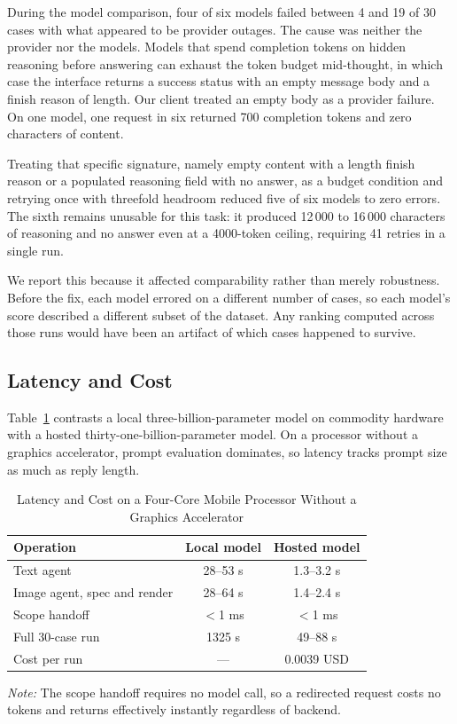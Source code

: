 \documentclass[9pt,twocolumn]{extarticle}
\newcommand{\tabref}[1]{Table~\ref{#1}}
\newcommand{\tabnote}[1]{\par\vspace{2pt}\footnotesize\textit{Note:} #1}
\begin{document}
During the model comparison, four of six models failed between 4 and 19 of 30
cases with what appeared to be provider outages. The cause was neither the
provider nor the models. Models that spend completion tokens on hidden
reasoning before answering can exhaust the token budget mid-thought, in which
case the interface returns a success status with an empty message body and a
finish reason of length. Our client treated an empty body as a provider
failure. On one model, one request in six returned 700 completion tokens and
zero characters of content.

Treating that specific signature, namely empty content with a length finish
reason or a populated reasoning field with no answer, as a budget condition and
retrying once with threefold headroom reduced five of six models to zero
errors. The sixth remains unusable for this task: it produced 12\,000 to
16\,000 characters of reasoning and no answer even at a 4000-token ceiling,
requiring 41 retries in a single run.

We report this because it affected comparability rather than merely robustness.
Before the fix, each model errored on a different number of cases, so each
model's score described a different subset of the dataset. Any ranking computed
across those runs would have been an artifact of which cases happened to
survive.

\subsection{Latency and Cost}
\tabref{tab:perf} contrasts a local three-billion-parameter model on commodity
hardware with a hosted thirty-one-billion-parameter model. On a processor
without a graphics accelerator, prompt evaluation dominates, so latency tracks
prompt size as much as reply length.

\begin{table}[t]
\centering
\caption{Latency and Cost on a Four-Core Mobile Processor Without a Graphics
Accelerator}
\label{tab:perf}
\small
\begin{tabular}{@{}lcc@{}}
\toprule
Operation & Local model & Hosted model\\
\midrule
Text agent                     & 28--53 s & 1.3--3.2 s\\
Image agent, spec and render   & 28--64 s & 1.4--2.4 s\\
Scope handoff                  & $<$1 ms & $<$1 ms\\
Full 30-case run               & 1325 s & 49--88 s\\
Cost per run                   & ---     & 0.0039 USD\\
\bottomrule
\end{tabular}
\tabnote{The scope handoff requires no model call, so a redirected request
costs no tokens and returns effectively instantly regardless of backend.}
\end{table}
\end{document}
